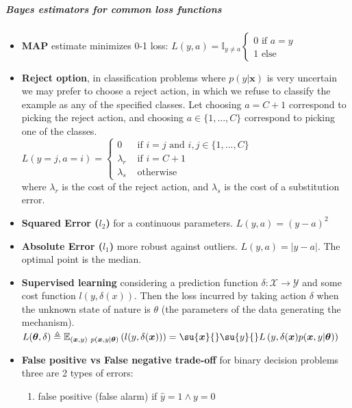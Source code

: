 \subparagraph{Bayes estimators for common loss functions}
\begin{itemize}
    \item \textbf{MAP} estimate minimizes 0-1 loss: $L(y, a) = \mathbb{I}_{y\neq a}
		\begin{cases}
			0 \text{ if } a = y\\
			1 \text{ else}
		\end{cases}$
    \item \textbf{Reject option}, in classification problems where $p(y|\bm{x})$ is very 
		uncertain we may prefer to choose a reject action, in which we refuse to 
		classify the example as any of the specified classes. Let choosing $a=C+1$
		correspond to picking the reject action, and choosing $a\in\{1,...,C\}$
		correspond to picking one of the classes.\\
		$L(y=j, a=i) = 
		\begin{cases}
			0 &\text{ if } i=j \text{ and } i,j\in\{1,...,C\}\\
			\lambda_{r} &\text{ if } i=C+1 \\
			\lambda_{s} &\text{ otherwise}
		\end{cases} $\\
		where $\lambda_{r}$ is the cost of the reject action, and $\lambda_{s}$ is
		the cost of a substitution error. 
    \item \textbf{Squared Error ($l_{2}$)} for a continuous parameters. $L(y, a) =
        (y-a)^{2}$
    \item \textbf{Absolute Error ($l_{1}$)} more robust against outliers. $L(y,a)=
		\lvert y-a\rvert$. The optimal point is the median.
    \item \textbf{Supervised learning} considering a prediction function $\delta: 
        \mathcal{X} \rightarrow \mathcal{Y}$ and some cost function $l(y, \delta(x))$. 
        Then the loss incurred by taking action $\delta$ when the unknown state of nature
        is $\theta$ (the parameters of the data generating the mechanism).
        $L(\bm{\theta}, \delta) \triangleq 
        \mathbb{E}_{(\bm{x}, y)~p(\bm{x},y|\bm{\theta})}\left(
        l(y, \delta(\bm{x}))\right)=\su{\bm{x}}{}\su{y}{}L\left(y,\delta(\bm{x}) 
        p(\bm{x},y|\bm{\theta})\right)$
    \item \textbf{False positive vs False negative trade-off} for binary decision problems
        three are 2 types of errors:
        \begin{enumerate}
            \item {false positive} (false alarm) if $\hat{y}=1 \wedge y=0$

\end{enumerate}
\end{itemize}

